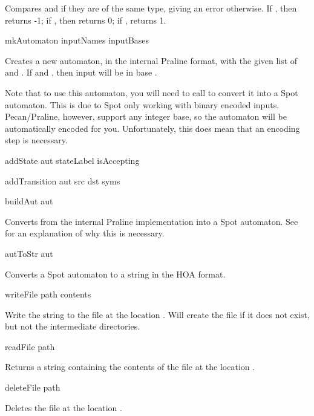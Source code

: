 Compares  and  if they are of the same type, giving an error otherwise.
If , then returns -1; if , then returns 0; if , returns 1.

\begin{pecan}
mkAutomaton inputNames inputBases
\end{pecan}

Creates a new automaton, in the internal Praline format, with the given list of  and .
If  and , then input  will be in base .

Note that to use this automaton, you will need to call  to convert it into a Spot automaton.
This is due to Spot only working with binary encoded inputs.
Pecan/Praline, however, support any integer base, so the automaton will be automatically encoded for you.
Unfortunately, this does mean that an encoding step is necessary.

\begin{pecan}
addState aut stateLabel isAccepting
\end{pecan}

\begin{pecan}
addTransition aut src dst syms
\end{pecan}

\begin{pecan}
buildAut aut
\end{pecan}

Converts  from the internal Praline implementation into a Spot automaton.
See  for an explanation of why this is necessary.

\begin{pecan}
autToStr aut
\end{pecan}

Converts a Spot automaton to a string in the HOA format.

\begin{pecan}
writeFile path contents
\end{pecan}

Write the string  to the file at the location .
Will create the file if it does not exist, but not the intermediate directories.

\begin{pecan}
readFile path
\end{pecan}

Returns a string containing the contents of the file at the location .

\begin{pecan}
deleteFile path
\end{pecan} 

Deletes the file at the location .
